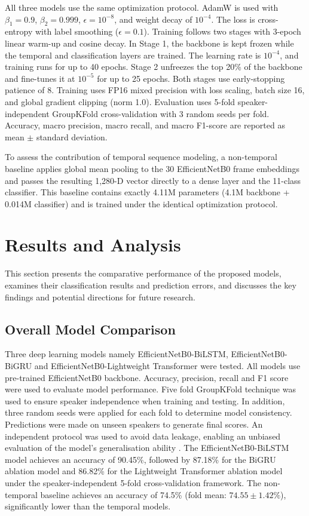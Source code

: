 \documentclass[journal]{IEEEtran}
\begin{document}
All three models use the same optimization protocol. AdamW \cite{loshchilov2017decoupled} is used with $\beta_1=0.9$, $\beta_2=0.999$, $\epsilon=10^{-8}$, and weight decay of $10^{-4}$. The loss is cross-entropy with label smoothing ($\epsilon=0.1$). Training follows two stages with 3-epoch linear warm-up and cosine decay. In Stage 1, the backbone is kept frozen while the temporal and classification layers are trained. The learning rate is $10^{-4}$, and training runs for up to 40 epochs. Stage 2 unfreezes the top 20\% of the backbone and fine-tunes it at $10^{-5}$ for up to 25 epochs. Both stages use early-stopping patience of 8. Training uses FP16 mixed precision with loss scaling, batch size 16, and global gradient clipping (norm 1.0). Evaluation uses 5-fold speaker-independent GroupKFold cross-validation with 3 random seeds per fold. Accuracy, macro precision, macro recall, and macro F1-score are reported as mean $\pm$ standard deviation.

To assess the contribution of temporal sequence modeling, a non-temporal baseline applies global mean pooling to the 30 EfficientNetB0 frame embeddings and passes the resulting 1,280-D vector directly to a dense layer and the 11-class classifier. This baseline contains exactly 4.11M parameters (4.1M backbone + 0.014M classifier) and is trained under the identical optimization protocol.

\section{Results and Analysis}
This section presents the comparative performance of the proposed models, examines their classification results and prediction errors, and discusses the key findings and potential directions for future research.

\subsection{Overall Model Comparison}

Three deep learning models namely EfficientNetB0-BiLSTM, EfficientNetB0-BiGRU and EfficientNetB0-Lightweight Transformer were tested. All models use pre-trained EfficientNetB0 backbone. Accuracy, precision, recall and F1 score were used to evaluate model performance.
Five fold GroupKFold technique was used to ensure speaker independence when training and testing. In addition, three random seeds were applied for each fold to determine model consistency. Predictions were made on unseen speakers to generate final scores. An independent protocol was used to avoid data leakage, enabling an unbiased evaluation of the model's generalisation ability \cite{nemani2023speakerindependent,sheng2024visual}.
The EfficientNetB0-BiLSTM model achieves an accuracy of 90.45\%, followed by 87.18\% for the BiGRU ablation model and 86.82\% for the Lightweight Transformer ablation model under the speaker-independent 5-fold cross-validation framework. The non-temporal baseline achieves an accuracy of 74.5\% (fold mean: $74.55 \pm 1.42\%$), significantly lower than the temporal models.
\end{document}
